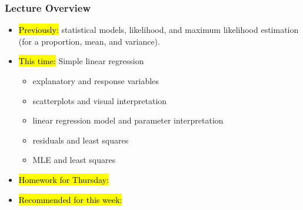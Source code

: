 

\begin{frame}
\frametitle{Lecture Overview}
    \begin{itemize}
    	\item \hl{Previously:} statistical models, likelihood, and maximum likelihood estimation (for a proportion, mean, and variance).
        \item \hl{This time:} Simple linear regression
        \begin{itemize}
            \item explanatory and response variables
            \item scatterplots and visual interpretation
            \item linear regression model and parameter interpretation
            \item residuals and least squares
            \item MLE and least squares
        \end{itemize}
        \item \hl{Homework for Thursday:}
        
	\item \hl{Recommended for this week:} 
    \end{itemize}
\end{frame}

